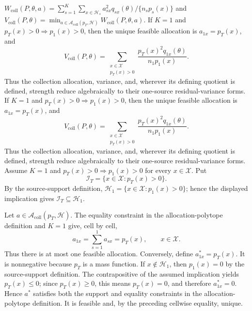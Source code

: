 \(W_{\mathrm{coll}}(P,\theta,a)=\sum_{s=1}^K\sum_{x\in\mathcal H_s}a_{sx}^2q_{sx}(\theta)/\{n_sp_s(x)\}\) and \(V_{\mathrm{coll}}(P,\theta)=\min_{a\in\mathcal A_{\mathrm{coll}}(p_T,\mathcal H)}W_{\mathrm{coll}}(P,\theta,a)\).
If \(K=1\) and \(p_T(x)>0\Rightarrow p_1(x)>0\), then the unique feasible allocation is \(a_{1x}=p_T(x)\), and
\[
V_{\mathrm{coll}}(P,\theta)
=\sum_{\substack{x\in\mathcal X\\ p_T(x)>0}}
\frac{p_T(x)^2q_{1x}(\theta)}{n_1p_1(x)}.
\]
Thus the collection allocation, variance, and, wherever its defining quotient is defined, strength reduce algebraically to their one-source residual-variance forms.
If \(K=1\) and \(p_T(x)>0\Rightarrow p_1(x)>0\), then the unique feasible allocation is \(a_{1x}=p_T(x)\), and
\[
V_{\mathrm{coll}}(P,\theta)
=\sum_{\substack{x\in\mathcal X\\ p_T(x)>0}}
\frac{p_T(x)^2q_{1x}(\theta)}{n_1p_1(x)}.
\]
Thus the collection allocation, variance, and, wherever its defining quotient is defined, strength reduce algebraically to their one-source residual-variance forms.
Assume \(K=1\) and \(p_T(x)>0\Rightarrow p_1(x)>0\) for every \(x\in\mathcal X\).  Put
\[
\mathcal I_T=\{x\in\mathcal X:p_T(x)>0\}.
\]
By the source-support definition, \(\mathcal H_1=\{x\in\mathcal X:p_1(x)>0\}\); hence the displayed implication gives \(\mathcal I_T\subseteq\mathcal H_1\).

Let \(a\in\mathcal A_{\mathrm{coll}}(p_T,\mathcal H)\).  The equality constraint in the allocation-polytope definition and \(K=1\) give, cell by cell,
\[
a_{1x}=\sum_{s=1}^{1}a_{sx}=p_T(x),\qquad x\in\mathcal X.
\]
Thus there is at most one feasible allocation.  Conversely, define \(a^*_{1x}=p_T(x)\).  It is nonnegative because \(p_T\) is a mass function.  If \(x\notin\mathcal H_1\), then \(p_1(x)=0\) by the source-support definition.  The contrapositive of the assumed implication yields \(p_T(x)\le 0\); since \(p_T(x)\ge0\), this means \(p_T(x)=0\), and therefore \(a^*_{1x}=0\).  Hence \(a^*\) satisfies both the support and equality constraints in the allocation-polytope definition.  It is feasible and, by the preceding cellwise equality, unique.

